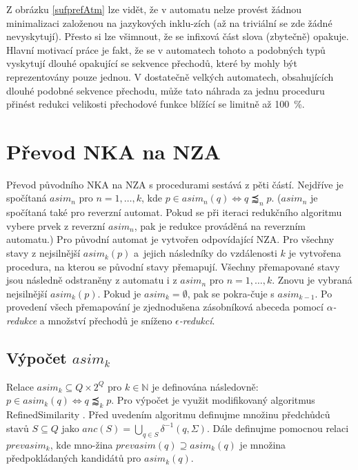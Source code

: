          Z obrázku \ref{sufprefAtm} lze vidět, že v automatu nelze provést žádnou minimalizaci založenou na jazykových inklu-zích (až na triviální se zde žádné nevyskytují). Přesto si lze všimnout, že se infixová část slova (zbytečně) opakuje. Hlavní motivací práce je fakt, že se v automatech tohoto a podobných typů vyskytují dlouhé opakující se sekvence přechodů, které by mohly být reprezentovány pouze jednou. V dostatečně velkých automatech, obsahujících dlouhé podobné sekvence přechodu, může tato náhrada za jednu proceduru přinést redukci velikosti přechodové funkce blížící se limitně až 100~\%.

\section{Převod NKA na NZA}
    Převod původního NKA na NZA s procedurami sestává z pěti částí. Nejdříve je spočítaná $asim_n$ pro $n = 1,\dots,k$, kde $p \in asim_n(q) \iff q \precapprox_n p$. ($asim_n$ je spočítaná také pro reverzní automat. Pokud se při iteraci redukčního algoritmu vybere prvek z reverzní $asim_n$, pak je redukce prováděná na reverzním automatu.) Pro původní automat je vytvořen odpovídající NZA. Pro všechny stavy z nejsilnější $asim_k(p)$ a~jejich následníky do vzdálenosti $k$ je vytvořena procedura, na kterou se původní stavy přemapují. Všechny přemapované stavy jsou následně odstraněny z automatu i z $asim_n$ pro $n = 1,\dots,k$. Znovu je vybraná nejsilnější $asim_k(p)$. Pokud je $asim_k = \emptyset$, pak se pokra-čuje s $asim_{k-1}$. Po provedení všech přemapování je zjednodušena zásobníková abeceda pomocí \textit{$\alpha$-redukce} a množství přechodů je sníženo \textit{$\epsilon$-redukcí}.

    \subsection{Výpočet $asim_k$}
    Relace $asim_k \subseteq Q \times 2^Q$ pro $k \in \mathbb{N}$ je definována následovně: $p \in asim_k(q) \iff q \precapprox_k p$. Pro výpočet je využit modifikovaný algoritmus RefinedSimilarity \cite{Computing_simulaitons}. Před uvedením algoritmu definujme množinu předchůdců stavů $S \subseteq Q$ jako $anc(S) = \bigcup_{q \in S} \delta^{-1}(q, \Sigma)$. Dále definujme pomocnou relaci $prevasim_k$, kde mno-žina $prevasim(q) \supseteq asim_k(q)$ je množina předpokládaných kandidátů pro $asim_k(q)$.

